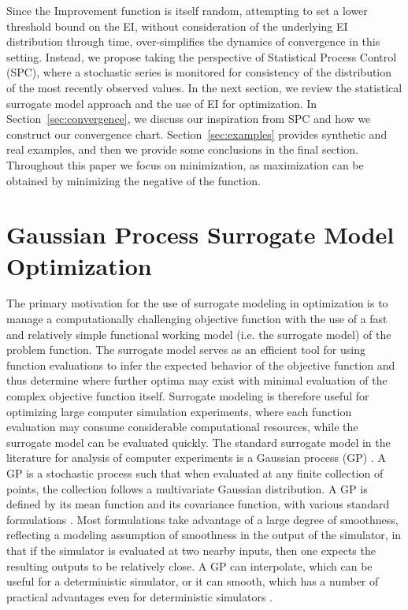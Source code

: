 \documentclass[12pt]{article}
\begin{document}
%
Since the Improvement function is itself random, attempting to 
set a lower threshold bound on the EI, without consideration of the underlying 
EI distribution through time, over-simplifies the dynamics of convergence
in this setting. 
%
Instead, we propose taking the perspective of Statistical
Process Control (SPC), where a stochastic series is monitored for 
consistency of the distribution of the most recently observed values.
In the next section, we review the statistical surrogate model approach and the use of EI for optimization.  In Section~\ref{sec:convergence}, we discuss our inspiration from SPC and how we construct our convergence chart.  Section~\ref{sec:examples} provides synthetic and real examples, and then we provide some conclusions in the final section. Throughout this paper we focus on minimization, as maximization can be obtained by minimizing the negative of the function.

\clearpage
%
%
\section{Gaussian Process Surrogate Model Optimization}
\label{sec:gp}
%
%

%
The primary motivation for the use of surrogate modeling in optimization is to manage a computationally challenging objective function with the use of a fast and relatively simple functional working model (i.e. the surrogate model) of the problem function. 
%
The surrogate model serves as an efficient tool for using function evaluations to infer the expected behavior of the objective function and thus determine where further optima may exist with minimal evaluation of the complex objective function itself.
%
Surrogate modeling is therefore useful for optimizing large computer simulation experiments, where each function evaluation may consume considerable computational resources, while the surrogate model can be evaluated quickly.
%
The standard surrogate model in the literature for analysis of computer experiments is a Gaussian process (GP) \citep{sacksDesign, santnerBook}. 
A GP is a stochastic process such that when evaluated at any finite collection of points, the collection follows a multivariate Gaussian distribution. 
%
A GP is defined by its mean function and its covariance function, with various standard formulations \citep{abrahamsenBook,steinBook}. 
%
Most formulations take advantage of a large degree of smoothness, reflecting a modeling assumption of smoothness in the output of the simulator, in that if the simulator is evaluated at two nearby inputs, then one expects the resulting outputs to be relatively close. 
%
A GP can interpolate, which can be useful for a deterministic simulator, or it can smooth, which has a number of practical advantages even for deterministic simulators \citep{gramacy2012}.
\end{document}
